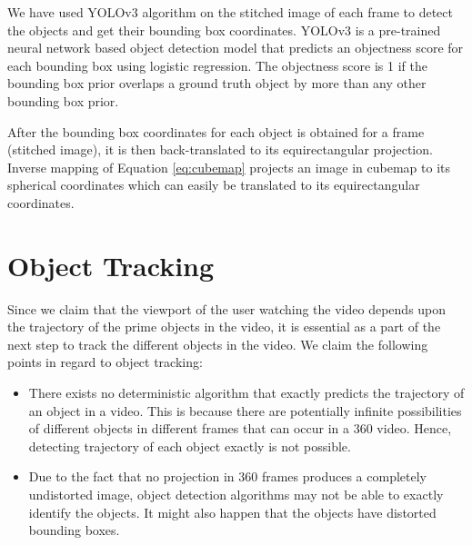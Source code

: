 \par
We have used YOLOv3 algorithm on the stitched image of each frame to detect the objects and get their bounding box coordinates. YOLOv3 is a pre-trained neural network based object detection model that predicts an objectness score for each bounding box using logistic regression. The objectness score is 1 if the bounding box prior overlaps a ground truth object by more than any other bounding box prior.

\par
After the bounding box coordinates for each object is obtained for a frame (stitched image), it is then back-translated to its equirectangular projection. Inverse mapping of Equation \ref{eq:cubemap} projects an image in cubemap to its spherical coordinates which can easily be translated to its equirectangular coordinates.

\section{Object Tracking}
Since we claim that the viewport of the user watching the video depends upon the trajectory of the prime objects in the video, it is essential as a part of the next step to track the different objects in the video. We claim the following points in regard to object tracking:
\begin{itemize}
    \item There exists no deterministic algorithm that exactly predicts the trajectory of an object in a video. This is because there are potentially infinite possibilities of different objects in different frames that can occur in a {360\degree} video. Hence, detecting trajectory of each object exactly is not possible.
    \item Due to the fact that no projection in {360\degree} frames produces a completely undistorted image, object detection algorithms may not be able to exactly identify the objects. It might also happen that the objects have distorted bounding boxes.
\end{itemize}

